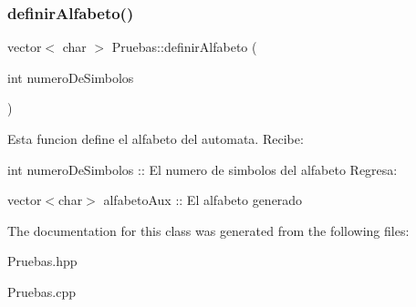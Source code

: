\subsubsection{\texorpdfstring{definir\+Alfabeto()}{definirAlfabeto()}}
{\footnotesize\ttfamily vector$<$ char $>$ Pruebas\+::definir\+Alfabeto (\begin{DoxyParamCaption}\item[{int}]{numero\+De\+Simbolos }\end{DoxyParamCaption})}

Esta funcion define el alfabeto del automata. Recibe\+:
\begin{DoxyItemize}
\item int numero\+De\+Simbolos \+:\+: El numero de simbolos del alfabeto Regresa\+:
\item vector$<$char$>$ alfabeto\+Aux \+:\+: El alfabeto generado 
\end{DoxyItemize}

The documentation for this class was generated from the following files\+:\begin{DoxyCompactItemize}
\item 
Pruebas.\+hpp\item 
Pruebas.\+cpp\end{DoxyCompactItemize}
